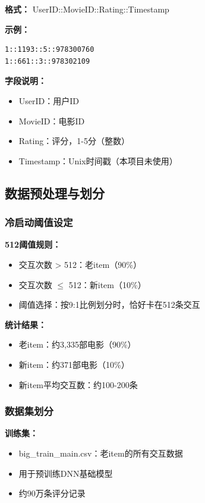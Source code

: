 \documentclass[12pt,a4paper]{article}
\begin{document}
\textbf{格式：} UserID::MovieID::Rating::Timestamp

\textbf{示例：}
\begin{lstlisting}
1::1193::5::978300760
1::661::3::978302109
\end{lstlisting}

\textbf{字段说明：}
\begin{itemize}
    \item UserID：用户ID
    \item MovieID：电影ID
    \item Rating：评分，1-5分（整数）
    \item Timestamp：Unix时间戳（本项目未使用）
\end{itemize}

\subsection{数据预处理与划分}

\subsubsection{冷启动阈值设定}

\textbf{512阈值规则：}
\begin{itemize}
    \item 交互次数 > 512：老item（90\%）
    \item 交互次数 $\leq$ 512：新item（10\%）
    \item 阈值选择：按9:1比例划分时，恰好卡在512条交互
\end{itemize}

\textbf{统计结果：}
\begin{itemize}
    \item 老item：约3,335部电影（90\%）
    \item 新item：约371部电影（10\%）
    \item 新item平均交互数：约100-200条
\end{itemize}

\subsubsection{数据集划分}

\textbf{训练集：}
\begin{itemize}
    \item big\_train\_main.csv：老item的所有交互数据
    \item 用于预训练DNN基础模型
    \item 约90万条评分记录
\end{itemize}
\end{document}
